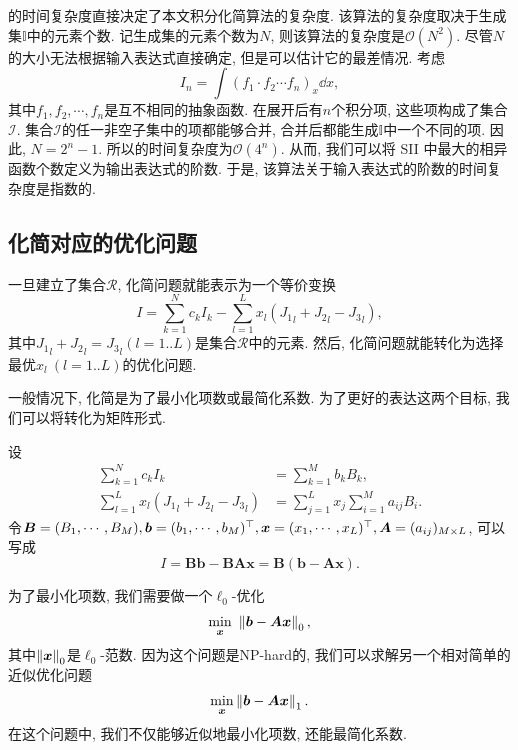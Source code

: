 的时间复杂度直接决定了本文积分化简算法的复杂度. 该算法的复杂度取决于生成集$\mathbb I$中的元素个数. 记生成集的元素个数为$N$, 则该算法的复杂度是$\mathcal O(N^2)$. 尽管$N$的大小无法根据输入表达式直接确定, 但是可以估计它的最差情况. 考虑
\begin{equation}
I_n=\int\!{(f_1\cdot f_2\cdots f_n)_x \dd x},
\label{worst_case}
\end{equation}
其中$f_1,f_2,\cdots,f_n$是互不相同的抽象函数. 在展开后有$n$个积分项, 这些项构成了集合$\mathcal I$. 集合$\mathcal I$的任一非空子集中的项都能够合并, 合并后都能生成$\mathbb I$中一个不同的项. 因此, $N=2^n-1$. 所以的时间复杂度为$\mathcal O(4^n)$. 从而, 我们可以将 SII 中最大的相异函数个数定义为输出表达式的阶数. 于是, 该算法关于输入表达式的阶数的时间复杂度是指数的. 

\subsection{化简对应的优化问题}\label{optimization-03}
一旦建立了集合$\mathcal R$, 化简问题就能表示为一个等价变换
\begin{equation}
I=\sum_{k=1}^N{c_k I_k}-\sum_{l=1}^L{x_l ({J_1}_l+{J_2}_l-{J_3}_l)},
\label{normal_simplify}
\end{equation}
其中${J_1}_l+{J_2}_l={J_3}_l(l=1..L)$是集合$\mathcal R$中的元素. 然后, 化简问题就能转化为选择最优$x_l~(l=1..L)$的优化问题.

一般情况下, 化简是为了最小化项数或最简化系数. 为了更好的表达这两个目标, 我们可以将转化为矩阵形式. 

设 
\begin{equation}
\begin{split}
\sum_{k=1}^N{c_k I_k} &= \sum_{k=1}^M{b_k B_k},\\
\sum_{l=1}^L{x_l ({J_1}_l+{J_2}_l-{J_3}_l)} &= \sum_{j=1}^L{x_j \sum_{i=1}^M{a_{ij} B_i}}.
\end{split}
\end{equation} 
令$\bm B=(B_1,\cdots,B_M),\bm b=(b_1,\cdots,b_M)^\top,\bm x=(x_1,\cdots,x_L)^\top,\bm A=(a_{ij})_{M \times L}$, 可以写成 
\begin{equation}
I=\bm{B}\bm{b}-\bm{B}\bm{A}\bm{x}=\bm{B}(\bm{b}-\bm{A}\bm{x}).
\end{equation}

为了最小化项数, 我们需要做一个$\ell_0$-优化
\begin{equation}
    \underset{\bm x}\min~\left\Vert\bm{b}-\bm{A}\bm{x}\right\Vert_0,
\end{equation}
其中$\left\Vert\bm x\right\Vert_0$是$\ell_0$-范数. 因为这个问题是NP-hard的, 我们可以求解另一个相对简单的近似优化问题
\begin{equation}
\underset{\bm x}\min\left\Vert\bm{b}-\bm{A}\bm{x}\right\Vert_1.
\label{LAE}
\end{equation}
在这个问题中, 我们不仅能够近似地最小化项数, 还能最简化系数. 

